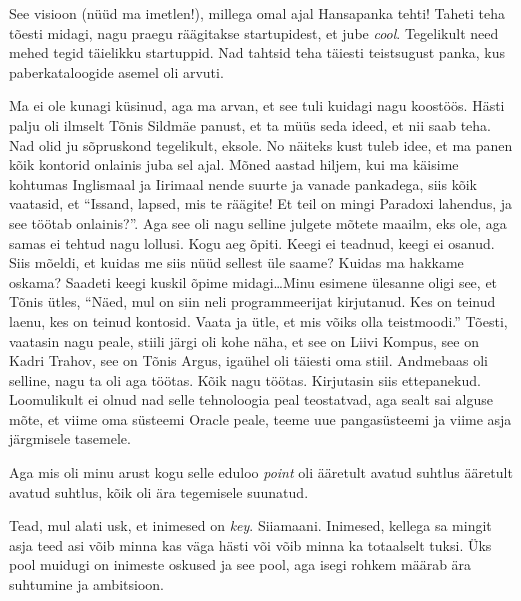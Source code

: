 
See visioon (nüüd ma imetlen!), millega omal ajal Hansapanka tehti! Taheti teha tõesti midagi, nagu praegu räägitakse startupidest, et jube \emph{cool}. Tegelikult need mehed tegid täielikku startuppid. Nad tahtsid teha täiesti teistsugust panka, kus  paberkataloogide asemel oli arvuti. 


Ma ei ole kunagi küsinud, aga ma arvan, et see tuli kuidagi nagu koostöös. Hästi palju oli  ilmselt Tõnis Sildmäe panust, et ta müüs seda ideed, et nii saab teha. Nad olid ju sõpruskond tegelikult, eksole. No näiteks kust tuleb idee, et ma panen kõik kontorid onlainis juba sel ajal. Mõned aastad hiljem, kui ma käisime kohtumas Inglismaal ja Iirimaal nende suurte ja vanade pankadega, siis kõik vaatasid, et \enquote{Issand, lapsed, mis te räägite! Et teil on mingi Paradoxi lahendus, ja see töötab onlainis?}. Aga see oli nagu selline julgete mõtete maailm, eks ole, aga samas ei tehtud nagu lollusi. Kogu aeg õpiti. Keegi ei teadnud, keegi ei osanud. Siis mõeldi, et kuidas me siis nüüd sellest üle saame? Kuidas ma hakkame oskama? Saadeti keegi kuskil õpime midagi\dots Minu esimene ülesanne oligi see, et Tõnis ütles, \enquote{Näed, mul on siin neli programmeerijat kirjutanud. Kes on teinud laenu, kes on teinud kontosid. Vaata ja ütle, et mis võiks olla teistmoodi.} Tõesti, vaatasin nagu peale, stiili järgi oli kohe näha, et see on Liivi Kompus, see on Kadri Trahov, see on Tõnis Argus, igaühel oli täiesti oma stiil. Andmebaas oli selline, nagu ta oli aga töötas. Kõik nagu töötas. Kirjutasin siis ettepanekud. Loomulikult ei olnud nad selle tehnoloogia peal teostatvad, aga sealt sai alguse mõte, et viime oma süsteemi Oracle peale, teeme uue pangasüsteemi ja viime asja järgmisele tasemele.

Aga mis oli minu arust kogu selle eduloo \emph{point} oli ääretult avatud suhtlus ääretult avatud suhtlus, kõik oli  ära tegemisele suunatud. 


Tead, mul alati usk, et inimesed on \emph{key}. Siiamaani. Inimesed, kellega sa mingit asja teed asi võib minna kas väga hästi või võib minna ka totaalselt tuksi. Üks pool muidugi on inimeste oskused ja see pool, aga isegi rohkem määrab ära suhtumine ja ambitsioon. 

